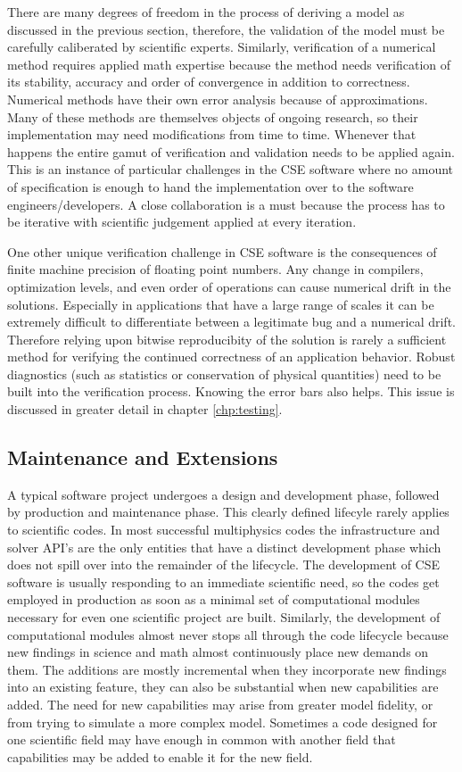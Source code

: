 There are many degrees of freedom in the process of deriving a
model as discussed in the previous section, therefore, the validation of the
model must be carefully caliberated by scientific experts. Similarly,
verification of a numerical method requires applied math expertise
because the method needs verification of its stability, accuracy and
order of  convergence in addition to correctness. Numerical methods
have their own error analysis because of approximations. Many of
these methods are themselves objects of ongoing research, so their
implementation may need modifications from time to time. Whenever
that happens the entire gamut of verification and validation needs to
be applied again. This is an instance of particular challenges in the
CSE software where no amount of specification is enough to hand the
implementation over to the software engineers/developers. A close
collaboration is a must because the process has to be iterative with
scientific judgement applied at every iteration. 

One other unique verification challenge in CSE software is the
consequences of finite machine precision of floating point
numbers. Any change in compilers, optimization levels, and even order
of operations can cause numerical drift in the solutions. Especially
in applications that have a large range of scales it can be extremely
difficult to differentiate between a legitimate bug and a numerical
drift. Therefore relying upon bitwise reproducibity of the solution is
rarely a sufficient method for verifying the continued correctness of
an application behavior. Robust diagnostics (such as statistics or
conservation of physical quantities) need to be built into the
verification process. Knowing the error bars also helps. This issue is
discussed in greater detail in chapter \ref{chp:testing}.

\subsection{Maintenance and Extensions}
\label{sec:maintain}
A typical software project undergoes a design and development phase,
followed by production and maintenance phase. This clearly
defined lifecyle rarely applies to scientific codes. In most successful multiphysics
codes the infrastructure and solver API's are the only entities that
have a distinct development phase which does not spill over into the
remainder of the lifecycle.  The development of CSE software is
usually responding to an immediate scientific need, so the codes get
employed in production as soon as a minimal set of computational
modules necessary for even one scientific project are
built. Similarly, the development of computational modules almost
never stops all through the code lifecycle because new findings in science
and math almost continuously place new demands on them. The additions
are mostly incremental when they incorporate new findings into an
existing feature, they can also be substantial when new capabilities
are added. The need for new capabilities may arise from 
greater model fidelity, or from trying to simulate a more complex
model. Sometimes a code designed for one scientific field may have
enough in common with another field that capabilities may be added to
enable it for the new field.   

